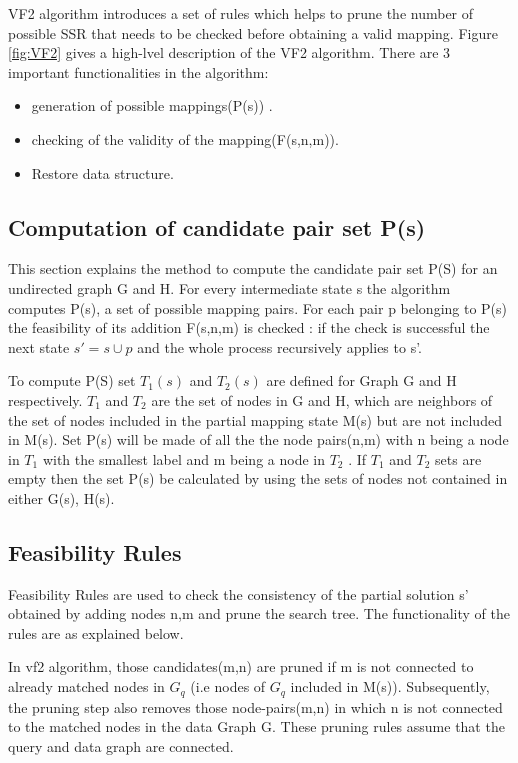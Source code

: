 VF2 algorithm introduces a set of rules which helps to prune the number of possible SSR that needs to be checked before obtaining a valid mapping. Figure \ref{fig:VF2} gives a high-lvel description of the VF2 algorithm.
There are 3 important functionalities in the algorithm: 
\begin{itemize}
\item generation of possible mappings(P(s)) .
\item checking of the validity of the mapping(F(s,n,m)).
\item Restore data structure.
\end{itemize}



\subsection{Computation of candidate pair set P(s)}
This section explains the method to compute the candidate pair set P(S) for an undirected graph G and H. 
For every intermediate state s the algorithm computes P(s), a set of possible mapping pairs. For each pair p belonging to P(s) the feasibility of its addition F(s,n,m) is checked : if the check is successful the next state $s' = s \cup p$ and the whole process recursively applies to s'.

To compute P(S) set $T_1(s)$ and $T_2(s)$ are defined for Graph G and H respectively. $T_1$ and $T_2$ are the set of  nodes in G and H, which are neighbors of the set of nodes included in the partial mapping state M(s) but are not included in M(s).
Set P(s) will be made of all the the node pairs(n,m) with n being a node in $T_1$ with the smallest label  and m being a node in $T_2$ . If  $T_1$ and $T_2$ sets are empty then the set P(s) be calculated by using the sets of nodes not contained in either G(s), H(s).

\subsection{Feasibility Rules}
Feasibility Rules are used to check the consistency of the partial solution s' obtained by adding nodes n,m and prune the search tree. The functionality of the rules are as explained below.

In vf2 algorithm, those candidates(m,n) are pruned if m is not connected to already matched nodes in $G_q$
(i.e nodes of $G_q$ included in M(s)).
Subsequently, the pruning step also removes those node-pairs(m,n) in which n is not connected to the matched 
nodes in the data Graph G. These pruning rules assume that the query and data graph are connected.\\

